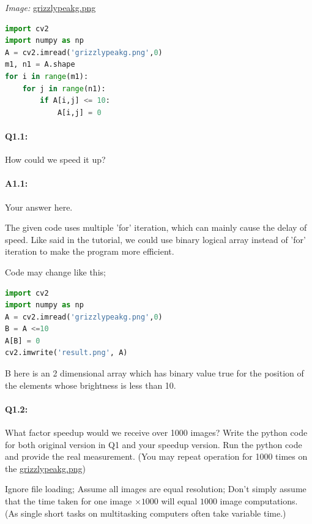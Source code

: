 \documentclass[11pt]{article}
\begin{document}
\emph{Image:} \href{grizzlypeakg.png}{grizzlypeakg.png}
\begin{lstlisting}[language=python]
import cv2
import numpy as np
A = cv2.imread('grizzlypeakg.png',0)
m1, n1 = A.shape
for i in range(m1):
    for j in range(n1):
        if A[i,j] <= 10:
            A[i,j] = 0
\end{lstlisting}

\paragraph{Q1.1:} How could we speed it up?

\paragraph{A1.1:} Your answer here.

The given code uses multiple 'for' iteration, which can mainly cause the delay of speed. Like said in the tutorial, we could use binary logical array instead of 'for' iteration to make the program more efficient.

Code may change like this;

\begin{lstlisting}[language=python]
import cv2
import numpy as np
A = cv2.imread('grizzlypeakg.png',0)
B = A <=10
A[B] = 0
cv2.imwrite('result.png', A)
\end{lstlisting}

B here is an 2 dimensional array which has binary value true for the position of the elements whose brightness is less than 10.
 

\pagebreak
\paragraph{Q1.2:} What factor speedup would we receive over 1000 images? Write the python code for both original version in Q1 and your speedup version. Run the python code and provide the real measurement. (You may repeat operation for 1000 times on the \href{grizzlypeakg.png}{grizzlypeakg.png})

Ignore file loading; Assume all images are equal resolution; Don't simply assume that the time taken for one image $\times1000$ will equal $1000$ image computations. (As single short tasks on multitasking computers often take variable time.)
\end{document}
